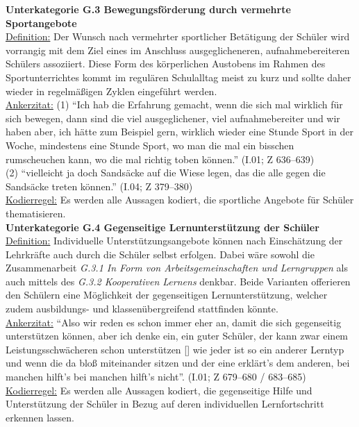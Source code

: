 \textbf{Unterkategorie G.3 Bewegungsförderung durch vermehrte Sportangebote}\\
\underline{Definition:} Der Wunsch nach vermehrter sportlicher Betätigung der Schüler wird vorrangig mit dem Ziel eines im Anschluss ausgeglicheneren, aufnahmebereiteren Schülers assoziiert. Diese Form des körperlichen Austobens im Rahmen des Sportunterrichtes kommt im regulären Schulalltag meist zu kurz und sollte daher wieder in regelmäßigen Zyklen eingeführt werden.\\
\underline{Ankerzitat:} (1) "`Ich hab die Erfahrung gemacht, wenn die sich mal wirklich für sich bewegen, dann sind die viel ausgeglichener, viel aufnahmebereiter und wir haben aber, ich hätte zum Beispiel gern, wirklich wieder eine Stunde Sport in der Woche, mindestens eine Stunde Sport, wo man die mal ein bisschen rumscheuchen kann, wo die mal richtig toben können."' (I.01; Z 636--639)\\ (2) "`vielleicht ja doch Sandsäcke auf die Wiese legen, das die alle gegen die Sandsäcke treten können."' (I.04; Z 379--380)\\
\underline{Kodierregel:} Es werden alle Aussagen kodiert, die sportliche Angebote für Schüler thematisieren.\\

\textbf{Unterkategorie G.4 Gegenseitige Lernunterstützung der Schüler}\\
\underline{Definition:} Individuelle Unterstützungsangebote können nach Einschätzung der Lehrkräfte auch durch die Schüler selbst erfolgen. Dabei wäre sowohl die Zusammenarbeit \textit{G.3.1 In Form von Arbeitsgemeinschaften und Lerngruppen} als auch mittels des \textit{G.3.2 Kooperativen Lernens} denkbar. Beide Varianten offerieren den Schülern eine Möglichkeit der gegenseitigen Lernunterstützung, welcher zudem ausbildungs- und klassenübergreifend stattfinden könnte.\\
\underline{Ankerzitat:} "`Also wir reden es schon immer eher an, damit die sich gegenseitig unterstützen können, aber ich denke ein, ein guter Schüler, der kann zwar einem Leistungsschwächeren schon unterstützen [\punkte] wie jeder ist so ein anderer Lerntyp und wenn die da bloß miteinander sitzen und der eine erklärt's dem anderen, bei manchen hilft's bei manchen hilft's nicht"'. (I.01; Z 679--680 / 683--685)\\
\underline{Kodierregel:} Es werden alle Aussagen kodiert, die gegenseitige Hilfe und Unterstützung der Schüler in Bezug auf deren individuellen Lernfortschritt erkennen lassen.\\

